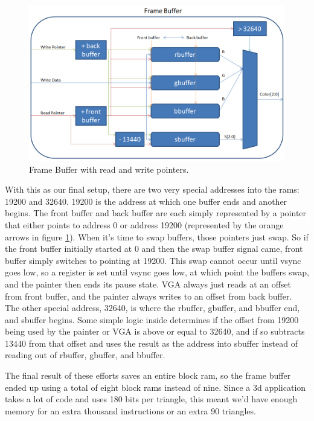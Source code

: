 \documentclass[onecolumn]{IEEEtran}
\begin{document}
\begin{figure}[H]
	\centering
	\includegraphics[width=1.0\textwidth]{framebuffer.png}
	\caption{Frame Buffer with read and write pointers.}
	\label{fig:frameBuffer}
\end{figure}

With this as our final setup, there are two very special addresses into the rams: 19200 and 32640.  19200 is the address at which one buffer ends and another begins.  The front buffer and back buffer are each simply represented by a pointer that either points to address 0 or address 19200 (represented by the orange arrows in figure \ref{fig:frameBuffer}).  When it’s time to swap buffers, those pointers just swap.  So if the front buffer initially started at 0 and then the swap buffer signal came, front buffer simply switches to pointing at 19200.  This swap cannot occur until vsync goes low, so a register is set until vsync goes low, at which point the buffers swap, and the painter then ends its pause state.  VGA always just reads at an offset from front buffer, and the painter always writes to an offset from back buffer.  The other special address, 32640, is where the rbuffer, gbuffer, and bbuffer end, and sbuffer begins.  Some simple logic inside determines if the offset from 19200 being used by the painter or VGA is above or equal to 32640, and if so subtracts 13440 from that offset and uses the result as the address into sbuffer instead of reading out of rbuffer, gbuffer, and bbuffer.

The final result of these efforts saves an entire block ram, so the frame buffer ended up using a total of eight block rams instead of nine.  Since a 3d application takes a lot of code and uses 180 bits per triangle, this meant we’d have enough memory for an extra thousand instructions or an extra 90 triangles.
\end{document}
